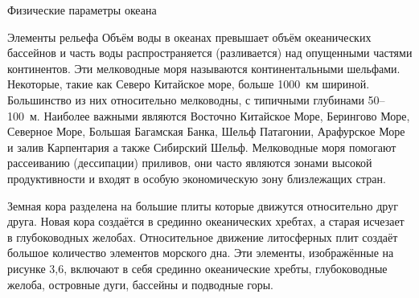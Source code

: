 \begin{chapter}{Физические параметры океана}
\begin{section}{Элементы рельефа}
Объём воды в океанах превышает объём океанических бассейнов и часть
воды распространяется (разливается) над опущенными частями
континентов. Эти мелководные моря называются континентальными
шельфами. Некоторые, такие как Северо Китайское море, больше 1000~км
шириной. Большинство из них относительно мелководны, с типичными
глубинами 50--100~м. Наиболее важными являются Восточно Китайское
Море, Берингово Море, Северное Море, Большая Багамская Банка, Шельф
Патагонии, Арафурское Море и залив Карпентария а также Сибирский
Шельф. Мелководные моря помогают рассеиванию (дессипации) приливов,
они часто являются зонами высокой продуктивности и входят в особую
экономическую зону близлежащих стран.
%

Земная кора разделена на большие плиты которые движутся относительно
друг друга. Новая кора создаётся в срединно океанических хребтах, а
старая исчезает в глубоководных желобах. Относительное движение
литосферных плит создаёт большое количество элементов морского
дна. Эти элементы, изображённые на рисунке 3,6, включают в себя
срединно океанические хребты, глубоководные желоба, островные дуги,
бассейны и подводные горы.
%



\end{section}
\end{chapter}
